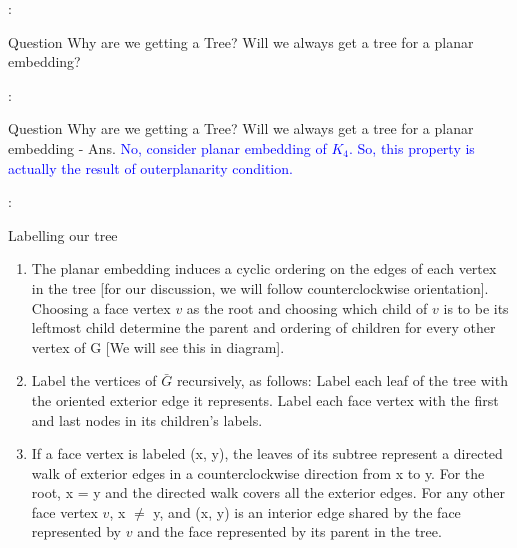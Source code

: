 \documentclass{beamer}
\begin{document}
\begin{frame}{\secname : \subsecname}
    \begin{block}{Question}
        Why are we getting a Tree? Will we always get a tree for a planar embedding?
    \end{block}

\end{frame}

\begin{frame}{\secname : \subsecname}
    \begin{block}{Question}
        Why are we getting a Tree? Will we always get a tree for a planar embedding - Ans. \textcolor{blue}{No, consider planar embedding of $K_4$. So, this property is actually the result of outerplanarity condition.}
    \end{block}

\end{frame}



\begin{framefont}{\small}
\begin{frame}{\secname : \subsecname}
    \begin{block}{Labelling our tree}
        \begin{enumerate}
        \item The planar embedding induces a cyclic ordering on the
        edges of each vertex in the tree [for our discussion, we will follow counterclockwise orientation]. Choosing a face vertex $v$ as the root and
        choosing which child of $v$ is to be its leftmost child determine the parent and
        ordering of children for every other vertex of G [We will see this in diagram].
        \item Label the vertices of $\bar{G}$ recursively, as follows: Label each leaf of the tree
        with the oriented exterior edge it represents. Label each face vertex with the
        first and last nodes in its children’s labels.
        \item If a face vertex is labeled (x, y), the leaves of its subtree represent a directed
        walk of exterior edges in a counterclockwise direction from x to y. For the
        root, x = y and the directed walk covers all the exterior edges. For any other
        face vertex $v$, x $\neq$ y, and (x, y) is an interior edge shared by the face
        represented by $v$ and the face represented by its parent in the tree.
        \end{enumerate}
    \end{block}

\end{frame}
\end{framefont}
\end{document}
